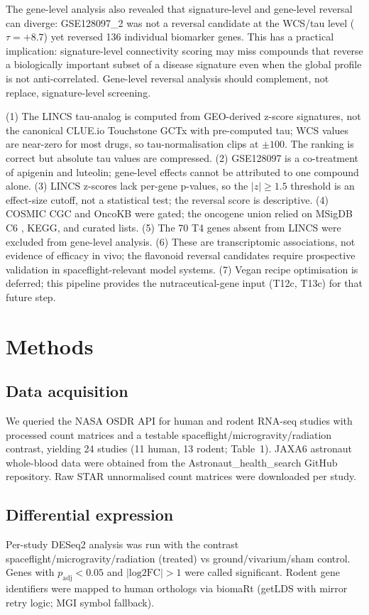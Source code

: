 \documentclass[pdflatex,sn-nature]{sn-jnl}
\begin{document}
The gene-level analysis also revealed that signature-level and gene-level reversal
can diverge: GSE128097\_2 was not a reversal candidate at the WCS/tau level (\(\tau
= +8.7\)) yet reversed 136 individual biomarker genes. This has a practical
implication: signature-level connectivity scoring may miss compounds that reverse a
biologically important subset of a disease signature even when the global profile is
not anti-correlated. Gene-level reversal analysis should complement, not replace,
signature-level screening.

(1) The LINCS tau-analog is computed from GEO-derived z-score signatures, not the
canonical CLUE.io Touchstone GCTx with pre-computed tau; WCS values are near-zero
for most drugs, so tau-normalisation clips at \(\pm 100\). The ranking is correct
but absolute tau values are compressed. (2) GSE128097 is a co-treatment of apigenin
and luteolin; gene-level effects cannot be attributed to one compound alone. (3)
LINCS z-scores lack per-gene p-values, so the \(|z| \geq 1.5\) threshold is an
effect-size cutoff, not a statistical test; the reversal score is descriptive. (4)
COSMIC CGC and OncoKB were gated; the oncogene union relied on MSigDB C6
\cite{liberzon2015}, KEGG, and curated lists. (5) The 70 T4 genes absent from LINCS
were excluded from gene-level analysis. (6) These are transcriptomic associations,
not evidence of efficacy in vivo; the flavonoid reversal candidates require
prospective validation in spaceflight-relevant model systems. (7) Vegan recipe
optimisation is deferred; this pipeline provides the nutraceutical-gene input
(T12c, T13c) for that future step.

\section{Methods}\label{sec:methods}

\subsection{Data acquisition}
We queried the NASA OSDR API \cite{beheshti2023} for human and rodent RNA-seq
studies with processed count matrices and a testable
spaceflight/microgravity/radiation contrast, yielding 24 studies (11 human, 13
rodent; Table~1). JAXA6 astronaut whole-blood data were obtained from the
Astronaut\_health\_search GitHub repository. Raw STAR unnormalised count matrices
were downloaded per study.

\subsection{Differential expression}
Per-study DESeq2 analysis was run with the contrast
spaceflight/microgravity/radiation (treated) vs ground/vivarium/sham control. Genes
with \(p_{\mathrm{adj}} < 0.05\) and \(|\text{log2FC}| > 1\) were called
significant. Rodent gene identifiers were mapped to human orthologs via biomaRt
(getLDS with mirror retry logic; MGI symbol fallback).
\end{document}
